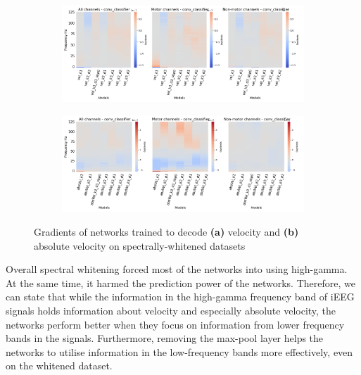 \begin{figure}[!htbp]
\begin{subfigure}[a]{\textwidth}
   \includegraphics[width=1\linewidth]{img/ch4/vel-pw-last-layer-grads}
   \caption{}
   \label{fig:vel-pw-last-layer-grads}
\end{subfigure}

\begin{subfigure}[b]{\textwidth}
   \includegraphics[width=1\linewidth]{img/ch4/absVel-pw-last-layer-grads}
   \caption{}
   \label{fig:absVel-pw-last-layet-grads}
\end{subfigure}
\caption[Spectral whitening - gradients]{Gradients of networks trained to decode \textbf{(a)} velocity and \textbf{(b)} absolute velocity on spectrally-whitened datasets}
\label{fig:pw-last-layer-grads}
\end{figure}

Overall spectral whitening forced most of the networks into using high-gamma. 
At the same time, it harmed the prediction power of the networks.
Therefore, we can state that while the information in the high-gamma frequency band of iEEG signals holds information about velocity and especially absolute velocity, the networks perform better when they focus on information from lower frequency bands in the signals. 
Furthermore, removing the max-pool layer helps the networks to utilise information in the low-frequency bands more effectively, even on the whitened dataset.

